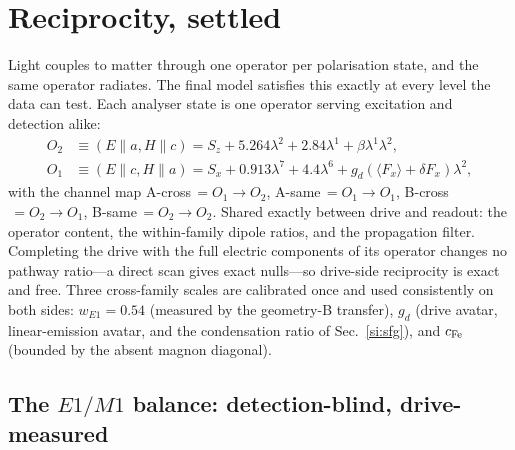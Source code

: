 \documentclass[11pt]{article}
\begin{document}
\section{Reciprocity, settled}
\label{si:reciprocity}

Light couples to matter through one operator per polarisation state,
and the same operator radiates.  The final model satisfies this
exactly at every level the data can test.  Each analyser state is one
operator serving excitation and detection alike:
\begin{align*}
O_2&\equiv(E\!\parallel\!a,H\!\parallel\!c)
   =S_z+5.264\lambda^2+2.84\lambda^1+\beta\lambda^1\lambda^2,\\
O_1&\equiv(E\!\parallel\!c,H\!\parallel\!a)
   =S_x+0.913\lambda^7+4.4\lambda^6
    +g_d(\langle F_x\rangle+\delta F_x)\lambda^2,
\end{align*}
with the channel map A-cross$\,=O_1\!\to\!O_2$,
A-same$\,=O_1\!\to\!O_1$, B-cross$\,=O_2\!\to\!O_1$,
B-same$\,=O_2\!\to\!O_2$.  Shared exactly between drive and readout:
the operator content, the within-family dipole ratios, and the
propagation filter.  Completing the drive with the full electric
components of its operator changes no pathway ratio---a direct scan
gives exact nulls---so drive-side reciprocity is exact and free.
Three cross-family scales are calibrated once and used consistently
on both sides: $w_{E1}=0.54$ (measured by the geometry-B transfer),
$g_d$ (drive avatar, linear-emission avatar, and the condensation
ratio of Sec.~\ref{si:sfg}), and $c_{\rm Fe}$ (bounded by the absent
magnon diagonal).

\subsection{The $E1/M1$ balance: detection-blind, drive-measured}
\label{si:e1m1}
\end{document}
